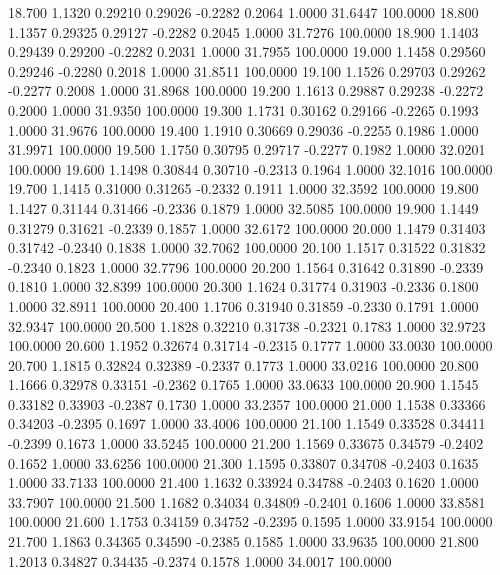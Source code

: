   18.700   1.1320   0.29210   0.29026  -0.2282   0.2064   1.0000  31.6447 100.0000
  18.800   1.1357   0.29325   0.29127  -0.2282   0.2045   1.0000  31.7276 100.0000
  18.900   1.1403   0.29439   0.29200  -0.2282   0.2031   1.0000  31.7955 100.0000
  19.000   1.1458   0.29560   0.29246  -0.2280   0.2018   1.0000  31.8511 100.0000
  19.100   1.1526   0.29703   0.29262  -0.2277   0.2008   1.0000  31.8968 100.0000
  19.200   1.1613   0.29887   0.29238  -0.2272   0.2000   1.0000  31.9350 100.0000
  19.300   1.1731   0.30162   0.29166  -0.2265   0.1993   1.0000  31.9676 100.0000
  19.400   1.1910   0.30669   0.29036  -0.2255   0.1986   1.0000  31.9971 100.0000
  19.500   1.1750   0.30795   0.29717  -0.2277   0.1982   1.0000  32.0201 100.0000
  19.600   1.1498   0.30844   0.30710  -0.2313   0.1964   1.0000  32.1016 100.0000
  19.700   1.1415   0.31000   0.31265  -0.2332   0.1911   1.0000  32.3592 100.0000
  19.800   1.1427   0.31144   0.31466  -0.2336   0.1879   1.0000  32.5085 100.0000
  19.900   1.1449   0.31279   0.31621  -0.2339   0.1857   1.0000  32.6172 100.0000
  20.000   1.1479   0.31403   0.31742  -0.2340   0.1838   1.0000  32.7062 100.0000
  20.100   1.1517   0.31522   0.31832  -0.2340   0.1823   1.0000  32.7796 100.0000
  20.200   1.1564   0.31642   0.31890  -0.2339   0.1810   1.0000  32.8399 100.0000
  20.300   1.1624   0.31774   0.31903  -0.2336   0.1800   1.0000  32.8911 100.0000
  20.400   1.1706   0.31940   0.31859  -0.2330   0.1791   1.0000  32.9347 100.0000
  20.500   1.1828   0.32210   0.31738  -0.2321   0.1783   1.0000  32.9723 100.0000
  20.600   1.1952   0.32674   0.31714  -0.2315   0.1777   1.0000  33.0030 100.0000
  20.700   1.1815   0.32824   0.32389  -0.2337   0.1773   1.0000  33.0216 100.0000
  20.800   1.1666   0.32978   0.33151  -0.2362   0.1765   1.0000  33.0633 100.0000
  20.900   1.1545   0.33182   0.33903  -0.2387   0.1730   1.0000  33.2357 100.0000
  21.000   1.1538   0.33366   0.34203  -0.2395   0.1697   1.0000  33.4006 100.0000
  21.100   1.1549   0.33528   0.34411  -0.2399   0.1673   1.0000  33.5245 100.0000
  21.200   1.1569   0.33675   0.34579  -0.2402   0.1652   1.0000  33.6256 100.0000
  21.300   1.1595   0.33807   0.34708  -0.2403   0.1635   1.0000  33.7133 100.0000
  21.400   1.1632   0.33924   0.34788  -0.2403   0.1620   1.0000  33.7907 100.0000
  21.500   1.1682   0.34034   0.34809  -0.2401   0.1606   1.0000  33.8581 100.0000
  21.600   1.1753   0.34159   0.34752  -0.2395   0.1595   1.0000  33.9154 100.0000
  21.700   1.1863   0.34365   0.34590  -0.2385   0.1585   1.0000  33.9635 100.0000
  21.800   1.2013   0.34827   0.34435  -0.2374   0.1578   1.0000  34.0017 100.0000
